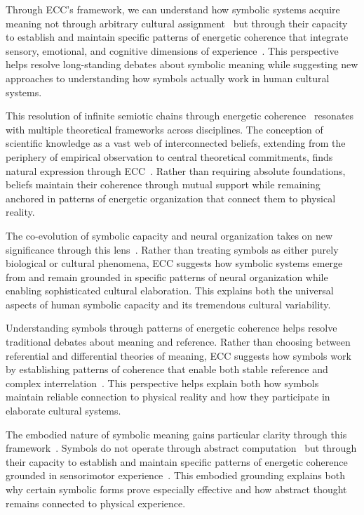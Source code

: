 Through ECC's framework, we can understand how symbolic systems acquire meaning not through arbitrary cultural assignment~ but through their capacity to establish and maintain specific patterns of energetic coherence that integrate sensory, emotional, and cognitive dimensions of experience~\cite{csordas1994embodiment}. This perspective helps resolve long-standing debates about symbolic meaning while suggesting new approaches to understanding how symbols actually work in human cultural systems.

This resolution of infinite semiotic chains through energetic coherence~ resonates with multiple theoretical frameworks across disciplines. The conception of scientific knowledge as a vast web of interconnected beliefs, extending from the periphery of empirical observation to central theoretical commitments, finds natural expression through ECC~\cite{quine1960word,latour2005reassembling}. Rather than requiring absolute foundations, beliefs maintain their coherence through mutual support while remaining anchored in patterns of energetic organization that connect them to physical reality.

The co-evolution of symbolic capacity and neural organization takes on new significance through this lens~\cite{deacon1997symbolic}. Rather than treating symbols as either purely biological or cultural phenomena, ECC suggests how symbolic systems emerge from and remain grounded in specific patterns of neural organization while enabling sophisticated cultural elaboration. This explains both the universal aspects of human symbolic capacity and its tremendous cultural variability.

Understanding symbols through patterns of energetic coherence helps resolve traditional debates about meaning and reference. Rather than choosing between referential and differential theories of meaning, ECC suggests how symbols work by establishing patterns of coherence that enable both stable reference and complex interrelation~\cite{kohn2013how}. This perspective helps explain both how symbols maintain reliable connection to physical reality and how they participate in elaborate cultural systems.

The embodied nature of symbolic meaning gains particular clarity through this framework~\cite{hutchins1995cognition,warnier2001praxeological}. Symbols do not operate through abstract computation~ but through their capacity to establish and maintain specific patterns of energetic coherence grounded in sensorimotor experience~. This embodied grounding explains both why certain symbolic forms prove especially effective and how abstract thought remains connected to physical experience.

